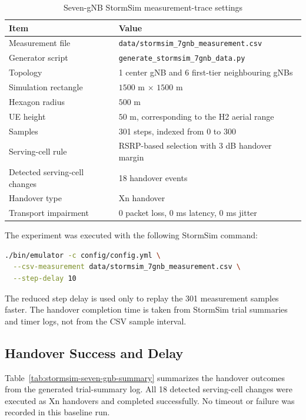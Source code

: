 \begin{table}[H]
\centering
\caption{Seven-gNB StormSim measurement-trace settings}
\small
\begin{tabularx}{\textwidth}{p{4.0cm}X}
\toprule
Item & Value\\
\midrule
Measurement file & \texttt{data/stormsim\_7gnb\_measurement.csv}\\
Generator script & \texttt{generate\_stormsim\_7gnb\_data.py}\\
Topology & 1 center gNB and 6 first-tier neighbouring gNBs\\
Simulation rectangle & \(1500\) m \(\times\) \(1500\) m\\
Hexagon radius & \(500\) m\\
UE height & \(50\) m, corresponding to the H2 aerial range\\
Samples & 301 steps, indexed from 0 to 300\\
Serving-cell rule & RSRP-based selection with 3 dB handover margin\\
Detected serving-cell changes & 18 handover events\\
Handover type & Xn handover\\
Transport impairment & 0 packet loss, 0 ms latency, 0 ms jitter\\
\bottomrule
\end{tabularx}
\label{tab:stormsim-seven-gnb-settings}
\end{table}

The experiment was executed with the following StormSim command:

\begin{lstlisting}[language=bash,caption={StormSim command for the seven-gNB measurement trace}]
./bin/emulator -c config/config.yml \
  --csv-measurement data/stormsim_7gnb_measurement.csv \
  --step-delay 10
\end{lstlisting}

The reduced step delay is used only to replay the 301 measurement samples faster. The handover completion time is taken from StormSim trial summaries and timer logs, not from the CSV sample interval.

\subsection{Handover Success and Delay}

Table~\ref{tab:stormsim-seven-gnb-summary} summarizes the handover outcomes from the generated trial-summary log. All 18 detected serving-cell changes were executed as Xn handovers and completed successfully. No timeout or failure was recorded in this baseline run.

